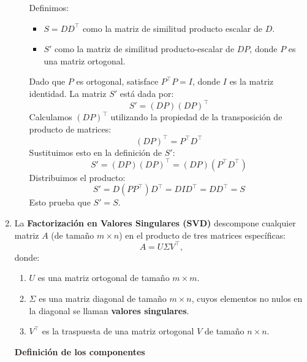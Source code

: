 \begin{enumerate}[label=\color{red}\textbf{\arabic*)}]
\begin{enumerate}[label=\color{red}\textbf{\alph*)}]
            Definimos:
            \begin{itemize}[label=\textbullet]
                \item $S=D D^\intercal$ como la matriz de similitud producto escalar de $D$.
                \item  $S'$ como la matriz de similitud producto-escalar de  $DP$, donde $P$ es una matriz ortogonal.
            \end{itemize}
            Dado que $P$ es ortogonal, satisface $P^\intercal P=I$, donde $I$ es la matriz identidad. La matriz  $S'$ está dada por: \[
            S'=(DP)(DP)^\intercal
            \] 
            Calculamos $(DP)^\intercal$ utilizando la propiedad de la transposición de producto de matrices: \[
                (DP)^\intercal=P^\intercal D^\intercal
            \] 
            Sustituimos esto en la definición de $S'$:  \[
            S'=(DP)(DP)^\intercal=(DP)(P^\intercal D^\intercal)
            \] 
            Distribuimos el producto: \[
            S'=D(PP^\intercal)D^\intercal=DID^\intercal=D D^\intercal=S
            \] 
            Esto prueba que $S'=S$.
    \end{enumerate}
\item {}

    La \textbf{Factorización en Valores Singulares (SVD)} descompone cualquier matriz $A$ (de tamaño $m\times n$) en el producto de tres matrices específicas: \[
    A=U\Sigma V^\intercal,
    \]donde:
    \begin{enumerate}[label=\arabic*)]
        \item $U$ es una matriz ortogonal de tamaño $m\times m$.
        \item $\Sigma$ es una matriz diagonal de tamaño  $m\times n$, cuyos elementos no nulos en la diagonal se llaman \textbf{valores singulares}.
        \item $V^\intercal$ es la traspuesta de una matriz ortogonal $V$ de tamaño  $n\times n$.
    \end{enumerate}
    \textbf{Definición de los componentes}


\end{enumerate}
